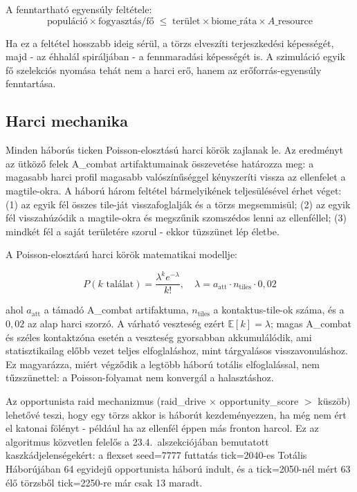 ﻿\documentclass[a4paper,12pt]{report}
\begin{document}
A fenntartható egyensúly feltétele:
\begin{equation}
\text{populáció} \times \text{fogyasztás/fő} \;\leq\; \text{terület} \times \text{biome\_ráta} \times A\_\text{resource}
\end{equation}

Ha ez a feltétel hosszabb ideig sérül, a törzs elveszíti terjeszkedési képességét, majd - az éhhalál spiráljában - a fennmaradási képességét is. A szimuláció egyik fő szelekciós nyomása tehát nem a harci erő, hanem az erőforrás-egyensúly fenntartása.

\subsection*{Harci mechanika}

Minden háborús ticken Poisson-elosztású harci körök zajlanak le. Az eredményt az ütköző felek A\_combat artifaktumainak összevetése határozza meg: a magasabb harci profil magasabb valószínűséggel kényszeríti vissza az ellenfelet a magtile-okra. A háború három feltétel bármelyikének teljesülésével érhet véget: (1) az egyik fél összes tile-ját visszafoglalják és a törzs megsemmisül; (2) az egyik fél visszahúzódik a magtile-okra és megszűnik szomszédos lenni az ellenféllel; (3) mindkét fél a saját területére szorul - ekkor tüzszünet lép életbe.

A Poisson-elosztású harci körök matematikai modellje:

\begin{equation}
P(k \text{ találat}) = \frac{\lambda^k e^{-\lambda}}{k!},
\quad \lambda = a_{\text{att}} \cdot n_{\text{tiles}} \cdot 0{,}02
\end{equation}

ahol $a_{\text{att}}$ a támadó A\_combat artifaktuma, $n_{\text{tiles}}$ a
kontaktus-tile-ok száma, és a $0{,}02$ az alap harci szorzó.
A várható veszteség ezért $\mathbb{E}[k] = \lambda$; magas A\_combat és széles
kontaktzóna esetén a veszteség gyorsabban akkumulálódik, ami statisztikailag
előbb vezet teljes elfoglaláshoz, mint tárgyalásos visszavonuláshoz.
Ez magyarázza, miért végződik a legtöbb háború totális elfoglalással, nem
tűzszünettel: a Poisson-folyamat nem konvergál a halasztáshoz.

Az opportunista raid mechanizmus (raid\_drive $\times$ opportunity\_score $>$ küszöb) lehetővé teszi, hogy egy törzs akkor is háborút kezdeményezzen, ha még nem ért el katonai fölényt - például ha az ellenfél éppen más fronton harcol. Ez az algoritmus közvetlen felelős a 23.4.~alszekciójában bemutatott kaszkádjelenségekért: a flexset seed=7777 futtatás tick=2040-es Totális Háborújában 64 egyidejű opportunista háború indult, és a tick=2050-nél mért 63 élő törzsből tick=2250-re már csak 13 maradt.
\end{document}
